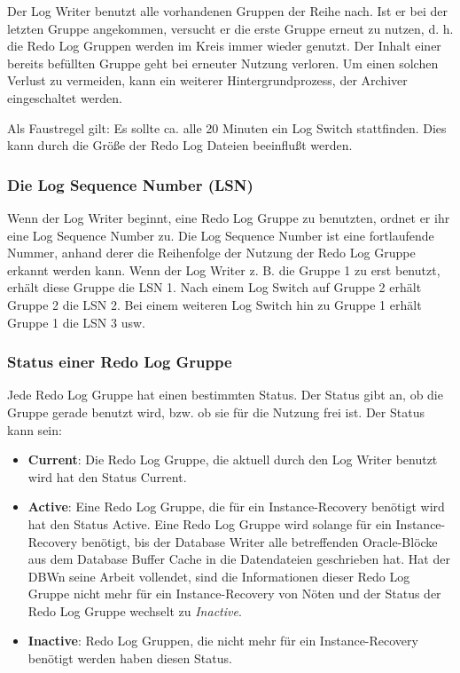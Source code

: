             Der Log Writer benutzt alle vorhandenen Gruppen der Reihe nach. Ist er bei der letzten Gruppe angekommen, versucht er die erste Gruppe erneut zu nutzen, d. h. die Redo Log Gruppen werden im Kreis immer wieder genutzt. Der Inhalt einer bereits bef\"ullten Gruppe geht bei erneuter Nutzung verloren. Um einen solchen Verlust zu vermeiden, kann ein weiterer Hintergrundprozess, der Archiver eingeschaltet werden.
            \begin{merke}
              Als Faustregel gilt: Es sollte ca. alle 20 Minuten ein Log Switch stattfinden. Dies kann durch die Gr\"o\ss{}e der Redo Log Dateien beeinflu\ss{}t werden.
            \end{merke}
          \subsubsection{Die Log Sequence Number (LSN)}
            Wenn der Log Writer beginnt, eine Redo Log Gruppe zu benutzten, ordnet er ihr eine Log Sequence Number zu. Die Log Sequence Number ist eine fortlaufende Nummer, anhand derer die Reihenfolge der Nutzung der Redo Log Gruppe erkannt werden kann. Wenn der Log Writer z. B. die Gruppe 1 zu erst benutzt, erh\"alt diese Gruppe die LSN 1. Nach einem Log Switch auf Gruppe 2 erh\"alt Gruppe 2 die LSN 2. Bei einem weiteren Log Switch hin zu Gruppe 1 erh\"alt Gruppe 1 die LSN 3 usw.
          \subsubsection{Status einer Redo Log Gruppe}
            Jede Redo Log Gruppe hat einen bestimmten Status. Der Status gibt an, ob die Gruppe gerade benutzt wird, bzw. ob sie f\"ur die Nutzung frei ist. Der Status kann sein:
            \begin{itemize}
              \item \textbf{Current}: Die Redo Log Gruppe, die aktuell durch den
              Log Writer benutzt wird hat den Status Current.
              \item \textbf{Active}: Eine Redo Log Gruppe, die f\"ur ein
              Instance-Recovery ben\"otigt wird hat den Status Active. Eine Redo
              Log Gruppe wird solange f\"ur ein Instance-Recovery ben\"otigt,
              bis der Database Writer alle betreffenden Oracle-Bl\"ocke aus dem
              Database Buffer Cache in die Datendateien geschrieben hat. Hat der
              DBWn seine Arbeit vollendet, sind die Informationen dieser Redo
              Log Gruppe nicht mehr f\"ur ein Instance-Recovery von N\"oten und
              der Status der Redo Log Gruppe wechselt zu \textit{Inactive}.
              \item \textbf{Inactive}: Redo Log Gruppen, die nicht mehr f\"ur
              ein Instance-Recovery ben\"otigt werden haben diesen Status.
            \end{itemize}

